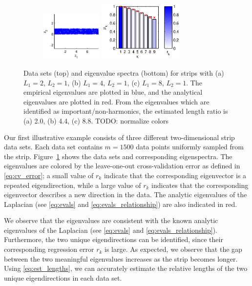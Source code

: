 \documentclass[preprint]{elsarticle}
\begin{document}
\begin{figure}[t]
\begin{subfigure}{0.3\textwidth}
\end{subfigure}
%
\hfill
%
\begin{subfigure}{0.35\textwidth}
\includegraphics[height=2.5cm]{strip_data_L8}
\includegraphics[height=3cm]{strip_spectrum_L8}
\caption{}
\end{subfigure}
%
\caption{Data sets (top) and eigenvalue spectra (bottom) for strips with (a) $L_1 = 2$, $L_2 = 1$, (b) $L_1 = 4$, $L_2 = 1$, (c) $L_1 = 8$, $L_2 = 1$. The empirical eigenvalues are plotted in blue, and the analytical eigenvalues are plotted in red. From the eigenvalues which are identified as important/non-harmonics, the estimated length ratio is (a) 2.0, (b) 4.4, (c) 8.8.  TODO: normalize colors}
\label{fig:strip_compare_analytic}
\end{figure}

Our first illustrative example consists of three different two-dimensional strip data sets. 
%
Each data set contains $m=1500$ data points uniformly sampled from the strip. 
%
Figure~\ref{fig:strip_compare_analytic} shows the data sets and corresponding eigenspectra.
%
The eigenvalues are colored by the leave-one-out cross-validation error as defined in \eqref{eq:cv_error}; a small value of $r_k$ indicate that the corresponding eigenvector is a repeated eigendirection, while a large value of $r_k$ indicates that the corresponding eigenvector describes a new direction in the data. 
%
The analytic eigenvalues of the Laplacian (see \eqref{eq:evals} and \eqref{eq:evals_relationship}) are also indicated in red. 

We observe that the eigenvalues are consistent with the known analytic eigenvalues of the Laplacian (see \eqref{eq:evals} and \eqref{eq:evals_relationship}).
%
Furthermore, the two unique eigendirections can be identified, since their corresponding regression error $r_k$ is large. 
%
As expected, we observe that the gap between the two meaningful eigenvalues increases as the strip becomes longer. 
%
Using \eqref{eq:est_lengths}, we can accurately estimate the relative lengths of the two unique eigendirections in each data set. 
\end{document}
